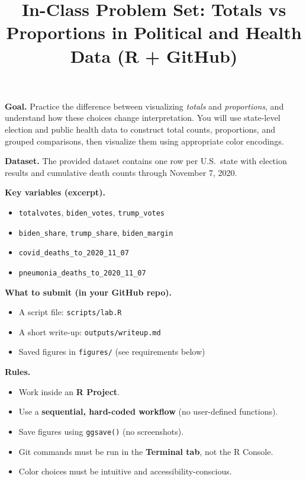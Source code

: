\documentclass[11pt]{article}
\title{In-Class Problem Set: Totals vs Proportions in Political and Health Data (R + GitHub)}
\author{}
\date{}
\begin{document}
\maketitle

\noindent \textbf{Goal.} Practice the difference between visualizing \emph{totals} and \emph{proportions}, and understand how these choices change interpretation. You will use state-level election and public health data to construct total counts, proportions, and grouped comparisons, then visualize them using appropriate color encodings.

\medskip
\noindent \textbf{Dataset.} The provided dataset contains one row per U.S.\ state with election results and cumulative death counts through November 7, 2020.

\medskip
\noindent \textbf{Key variables (excerpt).}
\begin{itemize}
  \item \texttt{totalvotes}, \texttt{biden\_votes}, \texttt{trump\_votes}
  \item \texttt{biden\_share}, \texttt{trump\_share}, \texttt{biden\_margin}
  \item \texttt{covid\_deaths\_to\_2020\_11\_07}
  \item \texttt{pneumonia\_deaths\_to\_2020\_11\_07}
\end{itemize}

\medskip
\noindent \textbf{What to submit (in your GitHub repo).}
\begin{itemize}
  \item A script file: \texttt{scripts/lab.R}
  \item A short write-up: \texttt{outputs/writeup.md}
  \item Saved figures in \texttt{figures/} (see requirements below)
\end{itemize}

\medskip
\noindent \textbf{Rules.}
\begin{itemize}
  \item Work inside an \textbf{R Project}.
  \item Use a \textbf{sequential, hard-coded workflow} (no user-defined functions).
  \item Save figures using \texttt{ggsave()} (no screenshots).
  \item Git commands must be run in the \textbf{Terminal tab}, not the R Console.
  \item Color choices must be intuitive and accessibility-conscious.
\end{itemize}
\end{document}

